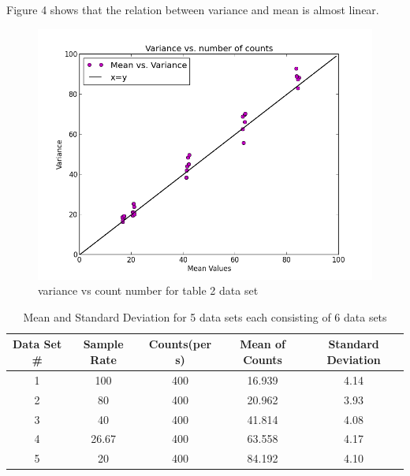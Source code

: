 \documentclass[letterpaper,12pt]{article}
\begin{document}
Figure 4 shows that the relation between variance and mean is almost linear.


\begin{figure}
\centering
\includegraphics[scale=0.6]{variance-all-together.png}
\caption{variance vs count number for table 2 data set}
\end{figure}




\begin{table}[ht]
\caption{Mean and Standard Deviation for 5 data sets each consisting of 6 data sets} %
\centering %
\begin{tabular}{c c c c c} %
\hline\hline %
Data Set \# & Sample Rate & Counts(per s) & Mean of Counts & Standard Deviation \\ [0.5ex] %
\hline %
1 & 100 & 400 & 16.939 & 4.14\\ %
2 & 80 & 400& 20.962  & 3.93\\
3 & 40 & 400& 41.814 & 4.08\\
4 & 26.67 & 400 & 63.558 & 4.17\\
5 & 20 & 400 & 84.192 & 4.10\\  [1ex] %
\hline %
\end{tabular}
\label{table:nonlin} %
\end{table}
\end{document}
